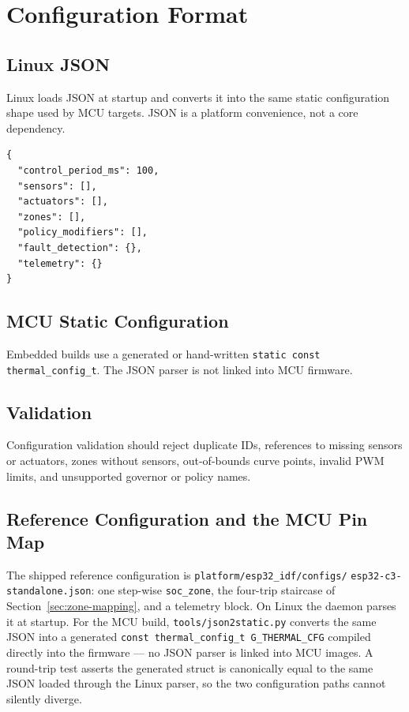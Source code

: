 \section{Configuration Format}

\subsection{Linux JSON}

Linux loads JSON at startup and converts it into the same static configuration shape used by MCU targets. JSON is a platform convenience, not a core dependency.

\begin{lstlisting}[caption={Top-level configuration sketch}]
{
  "control_period_ms": 100,
  "sensors": [],
  "actuators": [],
  "zones": [],
  "policy_modifiers": [],
  "fault_detection": {},
  "telemetry": {}
}
\end{lstlisting}

\subsection{MCU Static Configuration}

Embedded builds use a generated or hand-written \texttt{static const thermal\_config\_t}. The JSON parser is not linked into MCU firmware.

\subsection{Validation}

Configuration validation should reject duplicate IDs, references to missing sensors or actuators, zones without sensors, out-of-bounds curve points, invalid PWM limits, and unsupported governor or policy names.

\subsection{Reference Configuration and the MCU Pin Map}

The shipped reference configuration is \texttt{platform/esp32\_idf/configs/} \texttt{esp32-c3-standalone.json}: one step-wise \texttt{soc\_zone}, the four-trip staircase of Section~\ref{sec:zone-mapping}, and a telemetry block. On Linux the daemon parses it at startup. For the MCU build, \texttt{tools/json2static.py} converts the same JSON into a generated \texttt{const thermal\_config\_t G\_THERMAL\_CFG} compiled directly into the firmware --- no JSON parser is linked into MCU images. A round-trip test asserts the generated struct is canonically equal to the same JSON loaded through the Linux parser, so the two configuration paths cannot silently diverge.

